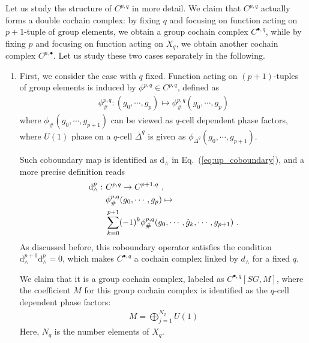 \documentclass[reprint,amsmath,amssymb,aps,pra,]{revtex4-1}
\newcommand{\dd}{\mathrm{d}} %
\begin{document}
Let us study the structure of $C^{p,q}$ in more detail.
We claim that $C^{p,q}$ actually forms a double cochain complex: by fixing $q$ and focusing on function acting on $p+1$-tuple of group elements, we obtain a group cochain complex $C^{\bullet,q}$, while by fixing $p$ and focusing on function acting on $X_q$, we obtain another cochain complex $C^{p,\bullet}$.
Let us study these two cases separately in the following.
\begin{enumerate}
  \item First, we consider the case with $q$ fixed. 
    Function acting on $(p+1)$-tuples of group elements is induced by $\phi^{p,q}\in C^{p,q}$, defined as
    \begin{align}
      \phi^{p,q}_\#:(g_0,\cdots,g_{p})\mapsto \phi^{p,q}_{\#}(g_0,\cdots,g_{p})
      \label{}
    \end{align}
    where $\phi_{\#}(g_0,\cdots,g_{p+1})$ can be viewed as $q$-cell dependent phase factors, where $U(1)$ phase on a $q$-cell $\bar{\Delta}^q$ is given as $\phi_{\bar{\Delta}^q}(g_0,\cdots,g_{p+1})$.

    Such coboundary map is identified as $\dd_\wedge$ in Eq.~(\ref{eq:up_coboundary}), and a more precise definition reads
    \begin{align}
      \dd_\wedge^p:~& C^{p,q}\rightarrow C^{p+1,q}~,\notag\\
      &\phi_{\#}^{p,q}(g_0,\cdots,g_{p})\mapsto\notag\\
      &\sum_{k=0}^{p+1}(-1)^k\phi^{p,q}_{\#}(g_0,\cdots,\hat{g}_k,\cdots,g_{p+1})~.
      \label{eq:double_complex_vertical_d}
    \end{align}
    As discussed before, this coboundary operator satisfies the condition $\dd_\wedge^{p+1}\dd_\wedge^p=0$, which makes $C^{\bullet,q}$ a cochain complex linked by $d_\wedge$ for a fixed $q$.

    We claim that it is a group cochain complex, labeled as $C^{\bullet,q}[SG,M]$, where the coefficient $M$ for this group cochain complex is identified as the $q$-cell dependent phase factors:
    \begin{align}
      M=\bigoplus_{j=1}^{N_q} U(1)
      \label{eq:eqv_cohomology_coeff}
    \end{align}
    Here, $N_q$ is the number elements of $X_q$.


\end{enumerate}
\end{document}
